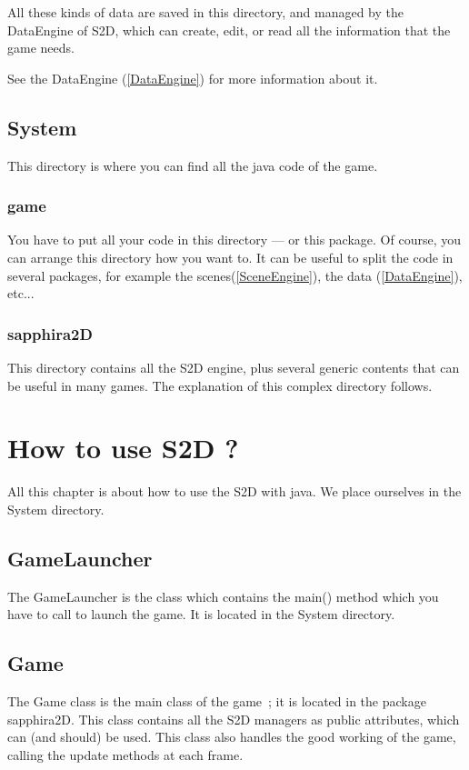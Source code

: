 \documentclass[a4paper,11pt]{report}
\begin{document}
			All these kinds of data are saved in this directory, and managed by the DataEngine of S2D, which can create, edit, or read
			all the information that the game needs.
	
			See the DataEngine (\ref{DataEngine}) for more information about it.
		\section{System}
			This directory is where you can find all the java code of the game.
	
			\subsection{game}
				You have to put all your code in this directory --- or this package. Of course, you can arrange this directory
				how you want to. It can be useful to split the code in several packages, for example the scenes(\ref{SceneEngine}), the data (\ref{DataEngine}), etc...
		
			\subsection{sapphira2D}
				This directory contains all the S2D engine, plus several generic contents that can be useful in many games.
				The explanation of this complex directory follows.
	
	\chapter{How to use S2D ?}
	
	All this chapter is about how to use the S2D with java. We place ourselves in the System directory.
	
	\section{GameLauncher}
		The GameLauncher is the class which contains the main() method which you have to call to launch the game.
		It is located in the System directory.
	
	\section{Game}
		The Game class is the main class of the game~; it is located in the package sapphira2D.
		This class contains all the S2D managers as public attributes, which can (and should) be used.
		This class also handles the good working of the game, calling the update methods at each frame.
		
\end{document}
